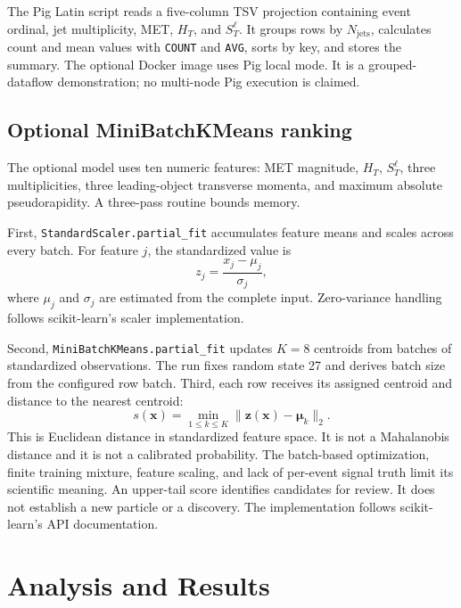 \documentclass[11pt,a4paper]{article}
\newcommand{\HT}{H_{T}}
\newcommand{\STlep}{S_{T}^{\ell}}
\newcommand{\njet}{N_{\mathrm{jets}}}
\begin{document}
The Pig Latin script reads a five-column TSV projection containing event ordinal, jet multiplicity, MET, \(\HT\), and \(\STlep\). It groups rows by \(\njet\), calculates count and mean values with \texttt{COUNT} and \texttt{AVG}, sorts by key, and stores the summary. The optional Docker image uses Pig local mode. It is a grouped-dataflow demonstration; no multi-node Pig execution is claimed.

\subsection{Optional MiniBatchKMeans ranking}

The optional model uses ten numeric features: MET magnitude, \(\HT\), \(\STlep\), three multiplicities, three leading-object transverse momenta, and maximum absolute pseudorapidity. A three-pass routine bounds memory.

First, \texttt{StandardScaler.partial\_fit} accumulates feature means and scales across every batch. For feature \(j\), the standardized value is
\begin{equation}z_j=\frac{x_j-\mu_j}{\sigma_j},\end{equation}
where \(\mu_j\) and \(\sigma_j\) are estimated from the complete input. Zero-variance handling follows scikit-learn's scaler implementation.

Second, \texttt{MiniBatchKMeans.partial\_fit} updates \(K=8\) centroids from batches of standardized observations. The run fixes random state 27 and derives batch size from the configured row batch. Third, each row receives its assigned centroid and distance to the nearest centroid:
\begin{equation}s(\mathbf{x})=\min_{1\leq k\leq K}\|\mathbf{z}(\mathbf{x})-\boldsymbol{\mu}_k\|_2.\label{eq:score}\end{equation}
This is Euclidean distance in standardized feature space. It is not a Mahalanobis distance and it is not a calibrated probability. The batch-based optimization, finite training mixture, feature scaling, and lack of per-event signal truth limit its scientific meaning. An upper-tail score identifies candidates for review. It does not establish a new particle or a discovery. The implementation follows scikit-learn's API documentation.

\section{Analysis and Results}
\end{document}
